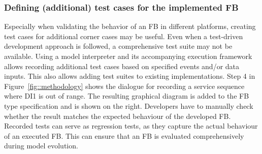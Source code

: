 \begin{bibunit}
\subsubsection{Defining (additional) test cases for the implemented FB}
Especially when validating the behavior of an FB in different platforms, creating test cases for additional corner cases may be useful. Even when a test-driven development approach is followed, a comprehensive test suite may not be available. Using a model interpreter and its accompanying execution framework~\cite{wiesmayr2021} allows recording additional test cases based on specified events and/or data inputs. This also allows adding test suites to existing implementations.  Step 4 in Figure~\ref{fig::methodology} shows the dialogue for recording a service sequence where DI1 is out of range. The resulting graphical diagram is added to the FB type specification and is shown on the right. Developers have to manually check whether the result matches the expected behaviour of the developed FB. Recorded tests can serve as regression tests, as they capture the actual behaviour of an executed FB. This can ensure that an FB is evaluated comprehensively during model evolution.


\end{bibunit}
